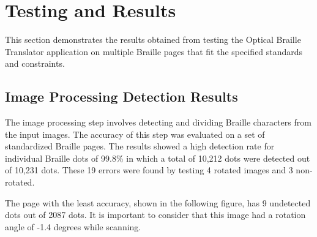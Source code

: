 \newpage
\setcounter{figure}{0}
\renewcommand{\thefigure}{9.\arabic{figure}}
\section{Testing and Results}

This section demonstrates the results obtained from testing the Optical Braille Translator application on multiple Braille pages that fit the specified standards and constraints.

\subsection{Image Processing Detection Results}
The image processing step involves detecting and dividing Braille characters from the input images. The accuracy of this step was evaluated on a set of standardized Braille pages. The results showed a high detection rate for individual Braille dots of 99.8\% in which a total of 10,212 dots were detected out of 10,231 dots. These 19 errors were  found by testing 4 rotated  images and 3 non-rotated. 

The page with the least accuracy, shown in the following figure, has 9 undetected dots  out of 2087 dots. It is important to consider that this image had a rotation angle of  -1.4 degrees while scanning.


